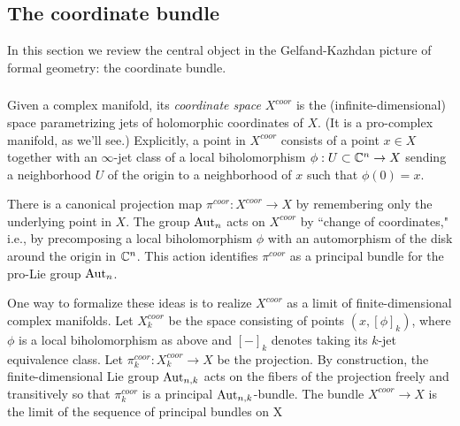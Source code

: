 \subsection{The coordinate bundle}

In this section we review the central object in the Gelfand-Kazhdan
picture of formal geometry: the coordinate bundle.


\subsubsection{}

Given a complex manifold, its {\em coordinate space} $X^{coor}$ is the (infinite-dimensional) space parametrizing jets of holomorphic coordinates of $X$. 
(It is a pro-complex manifold, as we'll see.) 
Explicitly, a point in $X^{coor}$ consists of a point $x \in X$ 
together with an $\infty$-jet class of a local biholomorphism $\phi : U \subset \mathbb C^n \to X$ 
sending a neighborhood $U$ of the origin to a neighborhood of $x$ such that $\phi(0) = x$. 

There is a canonical projection map $\pi^{coor} : X^{coor} \to X$ by remembering only the underlying point in $X$. 
The group ${\rm Aut}_n$ acts on $X^{coor}$ by ``change of coordinates," 
i.e., by precomposing a local biholomorphism $\phi$ with an automorphism of the disk around the origin in $\mathbb C^n$.
This action identifies $\pi^{coor}$ as a principal bundle for the pro-Lie group ${\rm Aut}_n$. 

One way to formalize these ideas is to realize $X^{coor}$ as a limit of finite-dimensional complex manifolds. 
Let $X_k^{coor}$ be the space consisting of points $(x, [\phi]_k)$, 
where $\phi$ is a local biholomorphism as above and $[-]_k$ denotes taking its $k$-jet equivalence class. 
Let $\pi_k^{coor} : X^{coor}_k \to X$ be the projection. 
By construction, the finite-dimensional Lie group ${\rm Aut}_{n,k}$ acts on the fibers of the projection freely and transitively 
so that $\pi_k^{coor}$ is a principal ${\rm Aut}_{n,k}$-bundle. The bundle $X^{coor} \to X$ is the limit of the sequence of principal bundles on X
\ben
{}
\een

